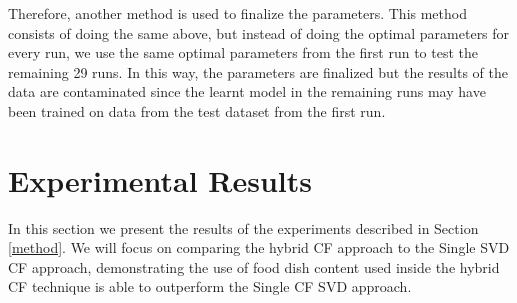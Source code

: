 Therefore, another method is used to finalize the parameters. This method consists of doing the same above, but instead of doing the optimal parameters for every run, we use the same optimal parameters from the first run to test the remaining 29 runs. In this way, the parameters are finalized but the results of the data are contaminated since the learnt model in the remaining runs may have been trained on data from the test dataset from the first run.  

\section{Experimental Results}

In this section we present the results of the experiments described in Section \ref{method}. We will focus on comparing the hybrid CF approach to the Single SVD CF approach, demonstrating the use of food dish content used inside the hybrid CF technique is able to outperform the Single CF SVD approach. 



